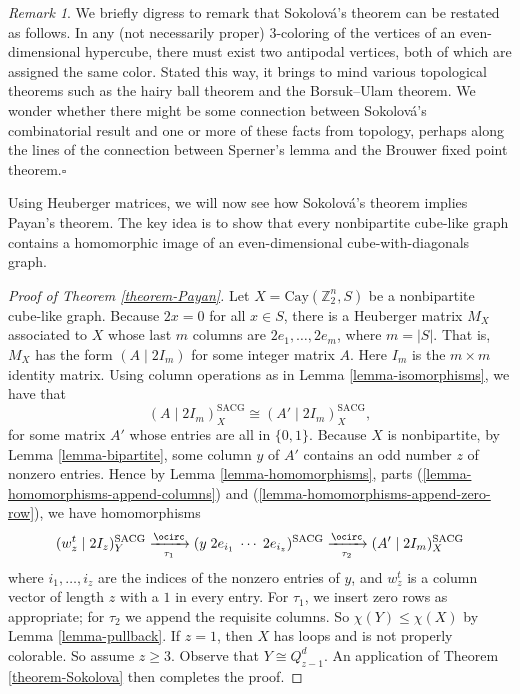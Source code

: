 \documentclass{article}
\theoremstyle{definition}
\theoremstyle{remark}
\newtheorem{Rmk}[Thm]{Remark}
\begin{document}
\begin{Rmk}We briefly digress to remark that Sokolov\'{a}'s theorem can be restated as follows.  In any (not necessarily proper) $3$-coloring of the vertices of an even-dimensional hypercube, there must exist two antipodal vertices, both of which are assigned the same color.  Stated this way, it brings to mind various topological theorems such as the hairy ball theorem and the Borsuk–Ulam theorem.   
We wonder whether there might be some connection between Sokolov\'{a}'s combinatorial result and one or more of these facts from topology, perhaps along the lines of the connection between Sperner's lemma and the Brouwer fixed point theorem.\hfill$\square$\end{Rmk}

Using Heuberger matrices, we will now see how Sokolov\'{a}'s theorem implies Payan's theorem.  The key idea is to show that every nonbipartite cube-like graph contains a homomorphic image of an even-dimensional cube-with-diagonals graph.

\begin{proof}[Proof of Theorem \ref{theorem-Payan}]Let $X=\text{Cay}(\mathbb{Z}_2^n,S)$ be a nonbipartite cube-like graph.  Because $2x=0$ for all $x\in S$, there is a Heuberger matrix $M_X$ associated to $X$ whose last $m$ columns are $2e_1,\dots,2e_m$, where $m=|S|$.  That is, $M_X$ has the form $(A\;\vert\;2I_m)$ for some integer matrix $A$.  Here $I_m$ is the $m\times m$ identity matrix.  Using column operations as in Lemma \ref{lemma-isomorphisms}, we have that \[(A\;\vert\;2I_m)_X^{\text{SACG}}\cong (A'\;\vert\;2I_m)_X^{\text{SACG}},\] for some matrix $A'$ whose entries are all in $\{0,1\}$.  Because $X$ is nonbipartite, by Lemma \ref{lemma-bipartite}, some column $y$ of $A'$ contains an odd number $z$ of nonzero entries.  Hence by Lemma \ref{lemma-homomorphisms}, parts (\ref{lemma-homomorphisms-append-columns}) and (\ref{lemma-homomorphisms-append-zero-row}), we have homomorphisms\[(w_z^t\;\vert\;2I_z)_Y^{\text{SACG}}\xrightarrow[\tau_1]{\ocirc}(y\;2e_{i_1}\;\cdots \;2e_{i_z})^{\text{SACG}}\xrightarrow[\tau_2]{\ocirc}(A'\;\vert\;2I_m)_X^{\text{SACG}}\]where $i_1,\dots,i_z$ are the indices of the nonzero entries of $y$, and $w_z^t$ is a column vector of length $z$ with a $1$ in every entry.  For $\tau_1$, we insert zero rows as appropriate; for $\tau_2$ we append the requisite columns.  So $\chi(Y)\leq\chi(X)$ by Lemma \ref{lemma-pullback}.  If $z=1$, then $X$ has loops and is not properly colorable.  So assume $z\geq 3$.  Observe that $Y\cong Q_{z-1}^d$.  An application of Theorem \ref{theorem-Sokolova} then completes the proof.\end{proof}
\end{document}
